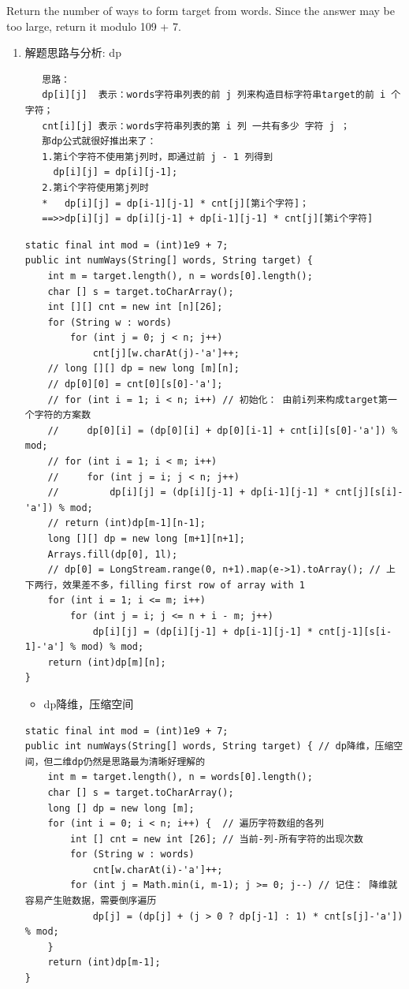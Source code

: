 \documentclass[9pt, b5paaper]{book}
\begin{document}
Return the number of ways to form target from words. Since the answer may be too large, return it modulo 109 + 7.
\begin{enumerate}
\item 解题思路与分析: dp
\label{sec-1-2-8-1}
\begin{verbatim}
   思路：
   dp[i][j]  表示：words字符串列表的前 j 列来构造目标字符串target的前 i 个字符；
   cnt[i][j] 表示：words字符串列表的第 i 列 一共有多少 字符 j ；
   那dp公式就很好推出来了：
   1.第i个字符不使用第j列时，即通过前 j - 1 列得到
     dp[i][j] = dp[i][j-1];
   2.第i个字符使用第j列时
   *   dp[i][j] = dp[i-1][j-1] * cnt[j][第i个字符]；
   ==>>dp[i][j] = dp[i][j-1] + dp[i-1][j-1] * cnt[j][第i个字符]
\end{verbatim}
\begin{verbatim}
static final int mod = (int)1e9 + 7;
public int numWays(String[] words, String target) {
    int m = target.length(), n = words[0].length();
    char [] s = target.toCharArray();
    int [][] cnt = new int [n][26];
    for (String w : words) 
        for (int j = 0; j < n; j++) 
            cnt[j][w.charAt(j)-'a']++;
    // long [][] dp = new long [m][n];
    // dp[0][0] = cnt[0][s[0]-'a'];
    // for (int i = 1; i < n; i++) // 初始化： 由前i列来构成target第一个字符的方案数
    //     dp[0][i] = (dp[0][i] + dp[0][i-1] + cnt[i][s[0]-'a']) % mod;
    // for (int i = 1; i < m; i++) 
    //     for (int j = i; j < n; j++) 
    //         dp[i][j] = (dp[i][j-1] + dp[i-1][j-1] * cnt[j][s[i]-'a']) % mod;
    // return (int)dp[m-1][n-1];
    long [][] dp = new long [m+1][n+1];
    Arrays.fill(dp[0], 1l);
    // dp[0] = LongStream.range(0, n+1).map(e->1).toArray(); // 上下两行，效果差不多，filling first row of array with 1
    for (int i = 1; i <= m; i++)
        for (int j = i; j <= n + i - m; j++) 
            dp[i][j] = (dp[i][j-1] + dp[i-1][j-1] * cnt[j-1][s[i-1]-'a'] % mod) % mod;
    return (int)dp[m][n];
}
\end{verbatim}
\begin{itemize}
\item dp降维，压缩空间
\end{itemize}
\begin{verbatim}
static final int mod = (int)1e9 + 7;
public int numWays(String[] words, String target) { // dp降维，压缩空间，但二维dp仍然是思路最为清晰好理解的
    int m = target.length(), n = words[0].length();
    char [] s = target.toCharArray();
    long [] dp = new long [m];
    for (int i = 0; i < n; i++) {  // 遍历字符数组的各列
        int [] cnt = new int [26]; // 当前-列-所有字符的出现次数
        for (String w : words) 
            cnt[w.charAt(i)-'a']++;
        for (int j = Math.min(i, m-1); j >= 0; j--) // 记住： 降维就容易产生赃数据，需要倒序遍历
            dp[j] = (dp[j] + (j > 0 ? dp[j-1] : 1) * cnt[s[j]-'a']) % mod;
    }
    return (int)dp[m-1];
}
\end{verbatim}
\end{enumerate}
\end{document}
